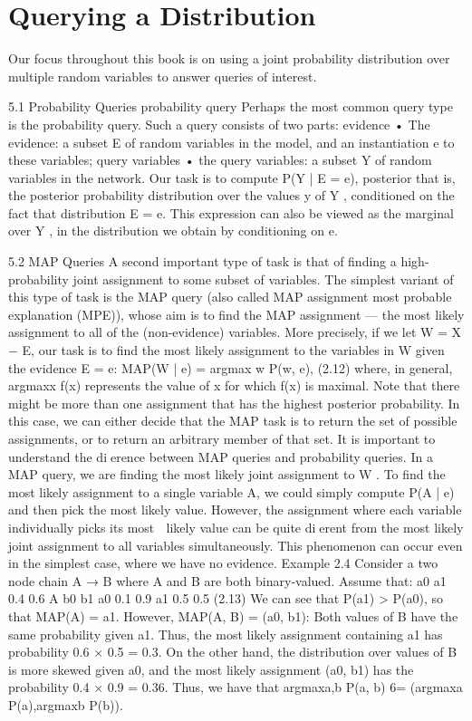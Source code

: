 \section{Querying a Distribution}

Our focus throughout this book is on using a joint probability distribution over multiple random variables to answer queries of interest.

5.1 Probability Queries
probability query Perhaps the most common query type is the probability query. Such a query consists of two parts: evidence • The evidence: a subset E of random variables in the model, and an instantiation e to these variables; query variables • the query variables: a subset Y of random variables in the network. Our task is to compute P(Y | E = e), posterior that is, the posterior probability distribution over the values y of Y , conditioned on the fact that distribution E = e. This expression can also be viewed as the marginal over Y , in the distribution we obtain by conditioning on e.

5.2 MAP Queries
A second important type of task is that of finding a high-probability joint assignment to some subset of variables. The simplest variant of this type of task is the MAP query (also called MAP assignment most probable explanation (MPE)), whose aim is to find the MAP assignment — the most likely assignment to all of the (non-evidence) variables. More precisely, if we let W = X − E, our task is to find the most likely assignment to the variables in W given the evidence E = e: MAP(W | e) = argmax w P(w, e), (2.12) where, in general, argmaxx f(x) represents the value of x for which f(x) is maximal. Note that there might be more than one assignment that has the highest posterior probability. In this case, we can either decide that the MAP task is to return the set of possible assignments, or to return an arbitrary member of that set. It is important to understand the dierence between MAP queries and probability queries. In a MAP query, we are finding the most likely joint assignment to W . To find the most likely assignment to a single variable A, we could simply compute P(A | e) and then pick the most likely value. However, the assignment where each variable individually picks its most  likely value can be quite dierent from the most likely joint assignment to all variables simultaneously. This phenomenon can occur even in the simplest case, where we have no evidence. Example 2.4 Consider a two node chain A → B where A and B are both binary-valued. Assume that: a0 a1 0.4 0.6 A b0 b1 a0 0.1 0.9 a1 0.5 0.5 (2.13) We can see that P(a1) > P(a0), so that MAP(A) = a1. However, MAP(A, B) = (a0, b1): Both values of B have the same probability given a1. Thus, the most likely assignment containing a1 has probability 0.6 × 0.5 = 0.3. On the other hand, the distribution over values of B is more skewed given a0, and the most likely assignment (a0, b1) has the probability 0.4 × 0.9 = 0.36. Thus, we have that argmaxa,b P(a, b) 6= (argmaxa P(a),argmaxb P(b)).

